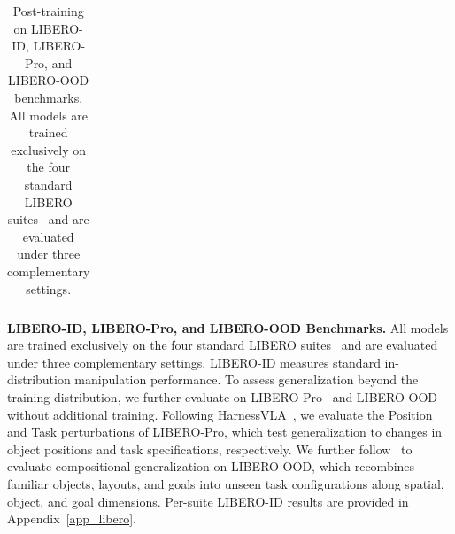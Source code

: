 \begin{table}[t]
{\begin{tabular}{l c ccc cccc}
\bottomrule
\end{tabular}
}
\caption{
Post-training on LIBERO-ID, LIBERO-Pro, and LIBERO-OOD benchmarks.
All models are trained exclusively on the four standard LIBERO suites~\citep{liu2023libero} and are evaluated under three complementary settings.
}
\label{tab:libero_generalization}
\vspace{-2mm}
\end{table}

\begin{table}[t]
\centering
\setlength{\tabcolsep}{4pt}
\caption{Post-training results on the RoboDojo simulation benchmark. Average score captures partial task progress, and success rate measures binary task completion; both are averaged over the five capability dimensions. Baseline results are taken from the official leaderboard.}
\label{tab:robodojo}
\end{table}

\textbf{LIBERO-ID, LIBERO-Pro, and LIBERO-OOD Benchmarks.}
All models are trained exclusively on the four standard LIBERO suites~\citep{liu2023libero} and are evaluated under three complementary settings. LIBERO-ID measures standard in-distribution manipulation performance. To assess generalization beyond the training distribution, we further evaluate on LIBERO-Pro~\citep{zhou2025liberopro} and LIBERO-OOD~\citep{li2025vlas} without additional training. Following HarnessVLA~\citep{zhang2026harness}, we evaluate the Position and Task perturbations of LIBERO-Pro, which test generalization to changes in object positions and task specifications, respectively. We further follow~\citep{mishra2026understanding} to evaluate compositional generalization on LIBERO-OOD, which recombines familiar objects, layouts, and goals into unseen task configurations along spatial, object, and goal dimensions. Per-suite LIBERO-ID results are provided in Appendix~\ref{app_libero}.

